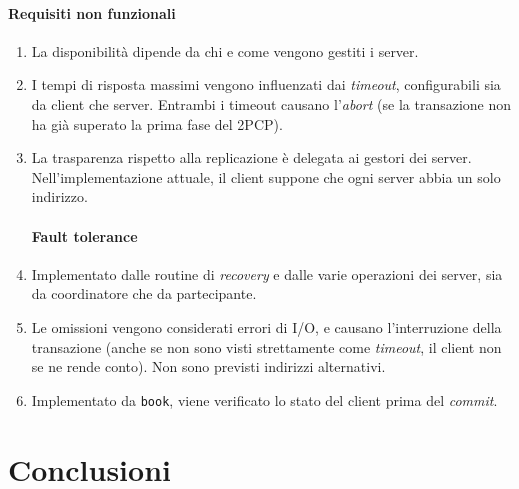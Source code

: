 \documentclass[a4paper]{article}
\begin{document}
\paragraph{Requisiti non funzionali}
\begin{enumerate}
	\item La disponibilità dipende da chi  e come vengono gestiti i server.
	\item I tempi di risposta massimi vengono influenzati dai \textit{timeout}, configurabili sia da client che server. Entrambi i timeout causano l'\textit{abort} (se la transazione non ha già superato la prima fase del 2PCP).
	\item La trasparenza rispetto alla replicazione è delegata ai gestori dei server. Nell'implementazione attuale, il client suppone che ogni server abbia un solo indirizzo.
	\paragraph{Fault tolerance}
	\item Implementato dalle routine di \textit{recovery} e dalle varie operazioni dei server, sia da coordinatore che da partecipante.
	\item Le omissioni vengono considerati errori di I/O, e causano l'interruzione della transazione (anche se non sono visti strettamente come \textit{timeout}, il client non se ne rende conto). Non sono previsti indirizzi alternativi.
	\item Implementato da \texttt{book}, viene verificato lo stato del client prima del \textit{commit}.
\end{enumerate}



\section{Conclusioni}


\appendix
\end{document}

